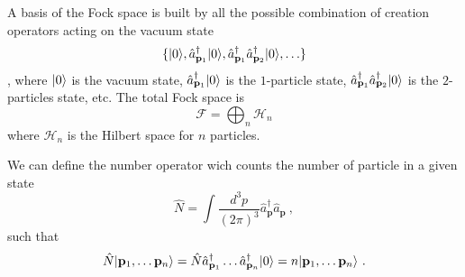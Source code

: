     A basis of the Fock space is built by all the possible combination of creation operators acting on the vacuum state 
    \begin{equation*}
        \{\vert0\rangle, \hat a_{\mathbf p_1}^\dagger \vert0\rangle, \hat a_{\mathbf p_1}^\dagger \hat a_{\mathbf p_2}^\dagger \vert0\rangle, \ldots \} 
    \end{equation*},
    where $\vert0\rangle$ is the vacuum state, $\hat a_{\mathbf p_1}^\dagger \vert0\rangle$ is the $1$-particle state, $\hat a_{\mathbf p_1}^\dagger \hat a_{\mathbf p_2}^\dagger \vert0\rangle$ is the $2$-particles state, etc. The total Fock space is 
    \begin{equation*}
        \mathcal F = \bigoplus_n \mathcal H_n
    \end{equation*}
    where $\mathcal H_n$ is the Hilbert space for $n$ particles.

    We can define the number operator wich counts the number of particle in a given state 
    \begin{equation*}
        \hat N = \int \frac{d^3 p}{(2\pi)^3} \hat a_{\mathbf p}^\dagger \hat a_{\mathbf p} ~,
    \end{equation*}
    such that 
    \begin{equation*}
        \hat N \vert\mathbf p_1, \ldots \mathbf p_n\rangle = \hat N \hat a_{\mathbf p_1}^\dagger \ldots \hat a_{\mathbf p_n}^\dagger \vert0\rangle =  n \vert\mathbf p_1, \ldots \mathbf p_n\rangle ~.
    \end{equation*}

